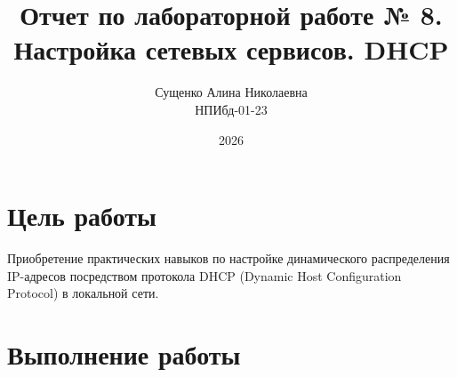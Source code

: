 

\title{Отчет по лабораторной работе № 8. \\ Настройка сетевых сервисов. DHCP}
\author{Сущенко Алина Николаевна \\ НПИбд-01-23}
\date{2026}



\maketitle
\newpage

\tableofcontents

\newpage
\section{Цель работы}
Приобретение практических навыков по настройке динамического распределения IP-адресов посредством протокола DHCP (Dynamic Host Configuration Protocol) в локальной сети.

\newpage
\section{Выполнение работы}


